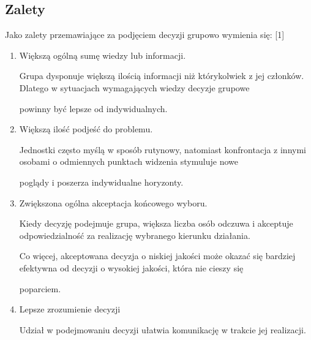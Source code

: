 \subsection{Zalety}
Jako zalety przemawiające za podjęciem decyzji grupowo wymienia się: [1]
\begin{enumerate}

  \item Większą ogólną sumę wiedzy lub informacji.
   
   Grupa dysponuje większą ilością informacji niż którykolwiek z jej członków. Dlatego w sytuacjach wymagających wiedzy decyzje grupowe 

powinny być lepsze od indywidualnych.
   
   \item Większą ilość podjeść do problemu.
   
   Jednostki często myślą w sposób rutynowy, natomiast konfrontacja z innymi osobami o odmiennych punktach widzenia stymuluje nowe 

poglądy i poszerza indywidualne horyzonty.
   
   \item Zwiększona ogólna akceptacja końcowego wyboru.
   
   Kiedy decyzję podejmuje grupa, większa liczba osób odczuwa i akceptuje odpowiedzialność za realizację wybranego kierunku działania. 

Co więcej, akceptowana decyzja o niskiej jakości może okazać się bardziej efektywna od decyzji o wysokiej jakości, która nie cieszy się 

poparciem.
   
   \item Lepsze zrozumienie decyzji
   
   Udział w podejmowaniu decyzji ułatwia komunikację w trakcie jej realizacji.

\end{enumerate}

